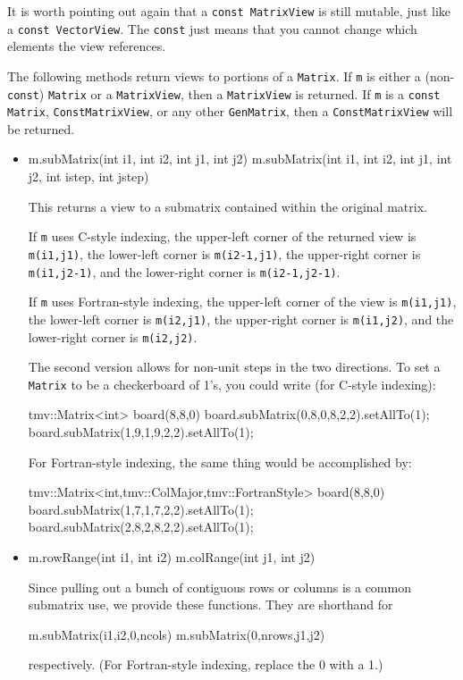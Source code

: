 \documentclass[twoside,letterpaper,11pt]{article}
\renewcommand{\tt}[1]{{\lstinline {#1}}}
\begin{document}
It is worth pointing out again that a 
\tt{const MatrixView} is still mutable, just like a \tt{const VectorView}.
The \tt{const} just means that you cannot change which elements
the view references.

The following methods return views to portions of a \tt{Matrix}.
If \tt{m} is either a (non-\tt{const}) \tt{Matrix}
or a \tt{MatrixView}, then a \tt{MatrixView} is returned.
If \tt{m} is a \tt{const Matrix}, \tt{ConstMatrixView}, or any other \tt{GenMatrix},
then a \tt{ConstMatrixView} will be returned. 

\begin{itemize}
\item
\begin{tmvcode}
m.subMatrix(int i1, int i2, int j1, int j2)
m.subMatrix(int i1, int i2, int j1, int j2, int istep, int jstep)
\end{tmvcode}
This returns a view to a submatrix contained within the original matrix.
\label{matrixaccess}

If \tt{m} uses C-style indexing, 
the upper-left corner of the returned view is \tt{m(i1,j1)},
the lower-left corner is \tt{m(i2-1,j1)},
the upper-right corner is \tt{m(i1,j2-1)}, and
the lower-right corner is \tt{m(i2-1,j2-1)}.

If \tt{m} uses Fortran-style indexing, 
the upper-left corner of the view is \tt{m(i1,j1)},
the lower-left corner is \tt{m(i2,j1)},
the upper-right corner is \tt{m(i1,j2)}, and
the lower-right corner is \tt{m(i2,j2)}.

The second version allows for non-unit steps in the two directions.
To set a \tt{Matrix} to be a checkerboard of 1's, you could write 
(for C-style indexing):
\begin{tmvcode}
tmv::Matrix<int> board(8,8,0)
board.subMatrix(0,8,0,8,2,2).setAllTo(1);
board.subMatrix(1,9,1,9,2,2).setAllTo(1);
\end{tmvcode}

For Fortran-style indexing, the same thing would be accomplished by:
\begin{tmvcode}
tmv::Matrix<int,tmv::ColMajor,tmv::FortranStyle> board(8,8,0)
board.subMatrix(1,7,1,7,2,2).setAllTo(1);
board.subMatrix(2,8,2,8,2,2).setAllTo(1);
\end{tmvcode}

\item
\begin{tmvcode}
m.rowRange(int i1, int i2)
m.colRange(int j1, int j2)
\end{tmvcode}
Since pulling out a bunch of contiguous rows or columns is a common 
submatrix use, we provide these functions.  They are shorthand for
\begin{tmvcode}
m.subMatrix(i1,i2,0,ncols)
m.subMatrix(0,nrows,j1,j2)
\end{tmvcode}
respectively.  (For Fortran-style indexing, replace the 0 with a 1.)


\end{itemize}
\end{document}
